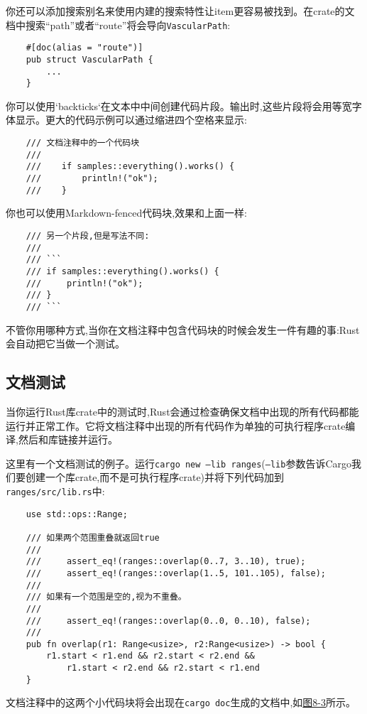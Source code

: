 你还可以添加搜索别名来使用内建的搜索特性让item更容易被找到。在crate的文档中搜索“path”或者“route”将会导向\texttt{VascularPath}:
\begin{verbatim}
    #[doc(alias = "route")]
    pub struct VascularPath {
        ...
    }
\end{verbatim}

你可以使用`backticks`在文本中中间创建代码片段。输出时,这些片段将会用等宽字体显示。更大的代码示例可以通过缩进四个空格来显示:
\begin{verbatim}
    /// 文档注释中的一个代码块
    ///
    ///    if samples::everything().works() {
    ///        println!("ok");
    ///    }
\end{verbatim}
你也可以使用Markdown-fenced代码块,效果和上面一样:
\begin{verbatim}
    /// 另一个片段,但是写法不同:
    /// 
    /// ```
    /// if samples::everything().works() {
    ///     println!("ok");
    /// }
    /// ```
\end{verbatim}

不管你用哪种方式,当你在文档注释中包含代码块的时候会发生一件有趣的事:Rust会自动把它当做一个测试。

\subsection{文档测试}
当你运行Rust库crate中的测试时,Rust会通过检查确保文档中出现的所有代码都能运行并正常工作。它将文档注释中出现的所有代码作为单独的可执行程序crate编译,然后和库链接并运行。

这里有一个文档测试的例子。运行\texttt{cargo new --lib ranges}(\texttt{--lib}参数告诉Cargo我们要创建一个库crate,而不是可执行程序crate)并将下列代码加到\texttt{ranges/src/lib.rs}中:
\begin{verbatim}
    use std::ops::Range;

    /// 如果两个范围重叠就返回true
    ///
    ///     assert_eq!(ranges::overlap(0..7, 3..10), true);
    ///     assert_eq!(ranges::overlap(1..5, 101..105), false);
    ///
    /// 如果有一个范围是空的,视为不重叠。
    ///
    ///     assert_eq!(ranges::overlap(0..0, 0..10), false);
    ///
    pub fn overlap(r1: Range<usize>, r2:Range<usize>) -> bool {
        r1.start < r1.end && r2.start < r2.end &&
            r1.start < r2.end && r2.start < r1.end
    }
\end{verbatim}

文档注释中的这两个小代码块将会出现在\texttt{cargo doc}生成的文档中,如\hyperref[f8-3]{图8-3}所示。


